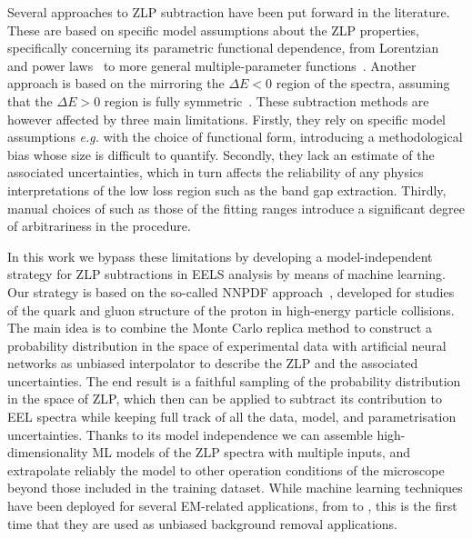 Several approaches to ZLP subtraction have been put forward in the literature.
%
These are based on specific model assumptions about the ZLP properties, specifically
concerning its parametric functional dependence, from Lorentzian~\cite{Dorneich:1998}
and power laws~\cite{Erni:2005} to more general multiple-parameter functions~\cite{Benthem:2001}.
%
Another approach is based on the mirroring the $\Delta E <0$ region of the spectra, assuming
that the $\Delta E>0$ region is fully symmetric~\cite{Lazar:2003}.
%
These  subtraction methods are however affected by three main limitations.
%
Firstly, they rely on specific model assumptions {\it e.g.} with
the choice of functional form, introducing a methodological
bias whose size is difficult to quantify.
%
Secondly, they lack an estimate of the associated uncertainties, which in turn affects
the reliability of any physics interpretations of the low loss region such as the band gap extraction.
%
Thirdly, manual choices of such as those of the fitting ranges introduce a significant degree of
arbitrariness in the procedure.

In this work we bypass these limitations by developing a model-independent strategy
for ZLP subtractions in EELS analysis by means of machine learning.
%
Our strategy is based on the so-called NNPDF approach~\cite{Ball:2008b,Ball:2012cx,Ball:2014uw,Ball:2017},
developed for studies
of the quark and gluon structure of the proton in high-energy particle collisions.
%
The main idea is to combine the  Monte Carlo replica  method to construct a probability
distribution in the space of experimental data with artificial
neural networks as unbiased interpolator to describe the ZLP and the associated
uncertainties.
%
The end result is a faithful sampling of the probability distribution in the space of ZLP,
which then can be applied to subtract its contribution to EEL spectra while keeping
full track of all the data, model, and parametrisation uncertainties.
%
Thanks to its model independence we can assemble high-dimensionality ML models
of the ZLP spectra with multiple inputs, and extrapolate reliably the model
to other operation conditions of the microscope beyond those included
in the training dataset.
%
While machine learning techniques have been deployed for several EM-related
applications, from to , this is the first time that they are used as unbiased
background removal applications.



